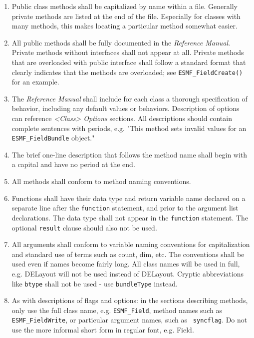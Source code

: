 \begin{enumerate}
\item Public class methods shall be capitalized by name within a file.
Generally private methods are listed at the end of the file.  Especially 
for classes with many methods, this makes locating a particular method 
somewhat easier.

\item All public methods shall be fully documented in the {\it Reference
Manual}.  Private methods without interfaces shall not appear at all.
Private methods that are overloaded with public interface shall follow
a standard format that clearly indicates that the methods are overloaded;
see {\tt ESMF\_FieldCreate()} for an example.

\item The {\it Reference Manual} shall include for each class a thorough
specification of behavior, including any default values or behaviors.
Description of options can reference {\it <Class> Options} sections.
All descriptions should contain complete sentences with periods,
e.g. "This method sets invalid values for an {\tt ESMF\_FieldBundle} object."

\item The brief one-line description that follows the method name shall
begin with a capital and have no period at the end.

\item All methods shall conform to method naming conventions.

\item Functions shall have their data type and return variable name declared
on a separate line after the {\tt function} statement, and prior to the
argument list declarations.  The data type shall not appear in the
{\tt function} statement.  The optional {\tt result} clause should also
not be used.

\item All arguments shall conform to variable naming conventions
for capitalization and standard use of terms such as count, dim, etc.
The conventions shall be used even if names become fairly long.
All class names will be used in full, e.g. DELayout will not be
used instead of DELayout.  Cryptic abbreviations like {\tt btype} 
shall not be used - use {\tt bundleType} instead.

\item As with descriptions of flags and options:  in the sections describing
methods, only use the full class name, e.g. {\tt ESMF\_Field}, method names such
as {\tt ESMF\_FieldWrite}, or particular argument names, such as {\tt
syncflag}. Do not use the more informal short form in regular 
font, e.g. Field.

\end{enumerate}



